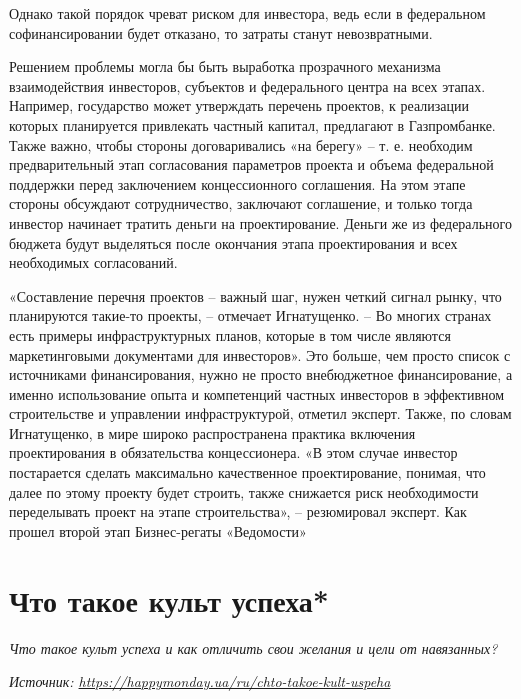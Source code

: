 Однако такой порядок чреват риском для инвестора, ведь если в федеральном софинансировании будет отказано, то затраты станут невозвратными.



Решением проблемы могла бы быть выработка прозрачного механизма взаимодействия инвесторов, субъектов и федерального центра на всех этапах. Например, государство может утверждать перечень проектов, к реализации которых планируется привлекать частный капитал, предлагают в Газпромбанке. Также важно, чтобы стороны договаривались «на берегу» – т. е. необходим предварительный этап согласования параметров проекта и объема федеральной поддержки перед заключением концессионного соглашения. На этом этапе стороны обсуждают сотрудничество, заключают соглашение, и только тогда инвестор начинает тратить деньги на проектирование. Деньги же из федерального бюджета будут выделяться после окончания этапа проектирования и всех необходимых согласований.

«Составление перечня проектов – важный шаг, нужен четкий сигнал рынку, что планируются такие-то проекты, – отмечает Игнатущенко. – Во многих странах есть примеры инфраструктурных планов, которые в том числе являются маркетинговыми документами для инвесторов». Это больше, чем просто список с источниками финансирования, нужно не просто внебюджетное финансирование, а именно использование опыта и компетенций частных инвесторов в эффективном строительстве и управлении инфраструктурой, отметил эксперт. Также, по словам Игнатущенко, в мире широко распространена практика включения проектирования в обязательства концессионера. «В этом случае инвестор постарается сделать максимально качественное проектирование, понимая, что далее по этому проекту будет строить, также снижается риск необходимости переделывать проект на этапе строительства», – резюмировал эксперт.
Как прошел второй этап Бизнес-регаты «Ведомости»

\clearpage


\section{Что такое культ успеха*}

\textit{Что такое культ успеха и как отличить свои желания и цели от навязанных?}

\textit{Источник: \url{https://happymonday.ua/ru/chto-takoe-kult-uspeha}}

